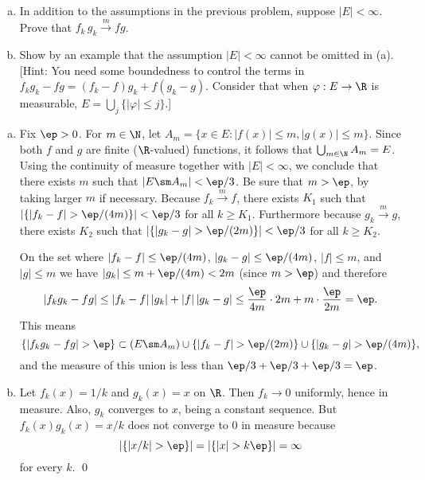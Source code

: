 \begin{hwsol} \hfill
\begin{enumerate}[(a)]
\item In addition to the assumptions in the previous problem, suppose $|E| < \infty$. Prove that $f_k \, g_k \xrightarrow{m} fg$.
\item Show by an example that the assumption $|E| < \infty$ cannot be omitted in (a). [Hint: You need some boundedness to control the terms in $f_k g_k - fg= (f_k-f)g_k + f (g_k - g)$. Consider that when $\varphi: E \to \R$ is measurable, $E= \bigcup_{j} \{ |\varphi| \leq j \}$.] \\
\end{enumerate}

\pf \hfill
\begin{enumerate}[(a)] 
\item Fix $\ep > 0$. For $m \in \N$, let $A_m= \{ x \in E \colon |f(x)| \leq m, |g(x)| \leq m\}$. Since both $f$ and $g$ are finite ($\R$-valued) functions, it follows that $\bigcup_{m \in \N}A_m= E$. Using the continuity of measure together with $|E| < \infty$, we conclude that there exists $m$ such that $|E \sm A_m| < \ep/3$. Be sure that $m > \ep$, by taking larger $m$ if necessary. Because $f_k \xrightarrow{m} f$, there exists $K_1$ such that $|\{ |f_k - f| > \ep/(4m) \}| < \ep/3$ for all $k \geq K_1$. Furthermore because $g_k \xrightarrow{m} g$, there exists $K_2$ such that $|\{ |g_k-g| > \ep/(2m) \}| < \ep/3$ for all $k \geq K_2$. 

On the set where $|f_k - f| \leq \ep/(4m)$, $|g_k - g| \leq \ep/(4m)$, $|f| \leq m$, and $|g| \leq m$ we have $|g_k| \leq m + \ep/(4m) < 2m$ (since $m > \ep$) and therefore 
        \[
        |f_kg_k - fg| \leq |f_k-f|\, |g_k| + |f|\, |g_k-g| \leq \frac{\ep}{4m} \cdot 2m + m \cdot \frac{\ep}{2m}= \ep.
        \]
This means
        \[
        \{ |f_kg_k - fg| > \ep \} \subset ( E \sm A_m) \cup \{ |f_k - f| > \ep/(2m) \} \cup \{ |g_k - g| > \ep/(4m) \},
        \]
and the measure of this union is less than $\ep/3 + \ep/3 + \ep/3= \ep$.

\item Let $f_k(x)= 1/k$ and $g_k(x)= x$ on $\R$. Then $f_k \to 0$ uniformly, hence in measure. Also, $g_k$ converges to $x$, being a constant sequence. But $f_k(x) g_k(x)= x/k$ does not converge to $0$ in measure because 
        \[
        |\{ |x/k| > \ep \}| =  |\{ |x| > k \ep \}|= \infty
        \]
for every $k$. \qed \\
\end{enumerate}
\end{hwsol}


